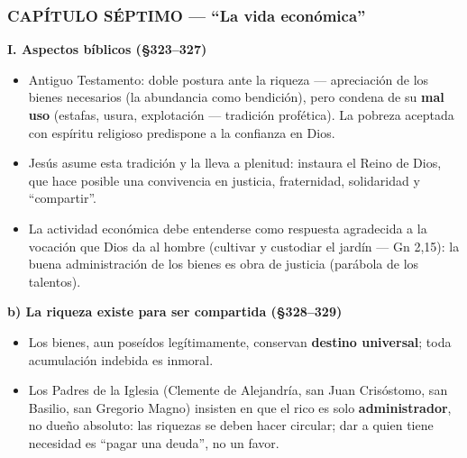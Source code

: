 \documentclass[10pt,a4paper]{article}
\begin{document}
\subsubsection{CAPÍTULO SÉPTIMO --- ``La vida económica''}

\medskip\noindent \textbf{I. Aspectos bíblicos (\S{}323--327)}\par\nopagebreak
\begin{itemize}
\item Antiguo Testamento: doble postura ante la riqueza --- apreciación de los bienes necesarios (la abundancia como bendición), pero condena de su \textbf{mal uso} (estafas, usura, explotación --- tradición profética). La pobreza aceptada con espíritu religioso predispone a la confianza en Dios.
\item Jesús asume esta tradición y la lleva a plenitud: instaura el Reino de Dios, que hace posible una convivencia en justicia, fraternidad, solidaridad y ``compartir''.
\item La actividad económica debe entenderse como respuesta agradecida a la vocación que Dios da al hombre (cultivar y custodiar el jardín --- Gn 2,15): la buena administración de los bienes es obra de justicia (parábola de los talentos).
\end{itemize}

\medskip\noindent \textbf{b) La riqueza existe para ser compartida (\S{}328--329)}\par\nopagebreak
\begin{itemize}
\item Los bienes, aun poseídos legítimamente, conservan \textbf{destino universal}; toda acumulación indebida es inmoral.
\item Los Padres de la Iglesia (Clemente de Alejandría, san Juan Crisóstomo, san Basilio, san Gregorio Magno) insisten en que el rico es solo \textbf{administrador}, no dueño absoluto: las riquezas se deben hacer circular; dar a quien tiene necesidad es ``pagar una deuda'', no un favor.
\end{itemize}
\end{document}
